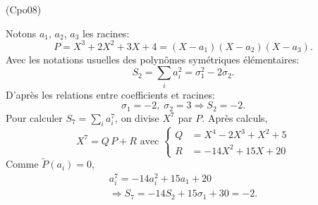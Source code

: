\begin{tiny}(Cpo08)\end{tiny} Notons $a_1$, $a_2$, $a_3$ les racines:
\[
  P = X^3 + 2 X^2 + 3X + 4 = (X-a_1)(X-a_2)(X-a_3).
\]
Avec les notations usuelles des polynômes symétriques élémentaires:
\[
  S_2 = \sum_i a_i^2 = \sigma_1^2 - 2 \sigma_2.
\]
D'après les relations entre coefficients et racines:
\[
  \sigma_1 = -2, \; \sigma_2 = 3 \Rightarrow  S_2 = -2.
\]
Pour calculer $S_7 = \sum_i a_i^7$, on divise $X^7$ par $P$. Après calculs,
\[
  X^7 = Q\,P + R \text{ avec }
\left\lbrace
\begin{aligned}
  Q &= X^4 - 2X^3 + X^2 + 5\\
  R &= -14X^2 + 15X +20
\end{aligned}
\right.
\]
Comme $\widetilde{P}(a_i) = 0$,
\begin{multline*}
  a_i^7 = -14 a_i^2 + 15 a_1 + 20 \\
  \Rightarrow
  S_7 = -14 S_2 + 15 \sigma_1 + 30 = -2.
\end{multline*}
